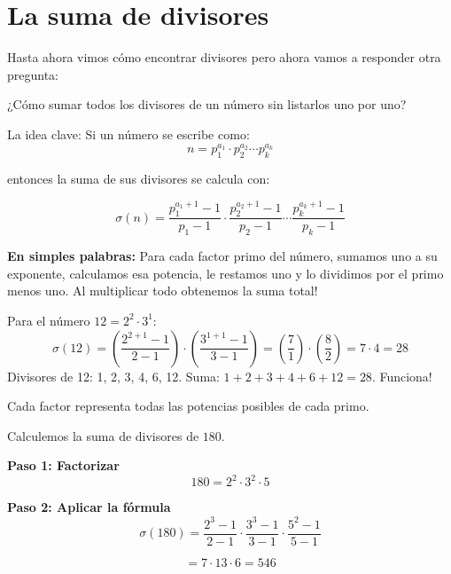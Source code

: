 \documentclass[12pt]{article}
\begin{document}
    \newpage
    \section{La suma de divisores}
    Hasta ahora vimos cómo encontrar divisores pero ahora vamos a responder otra pregunta:

    \begin{idea}
        ¿Cómo sumar todos los divisores de un número sin listarlos uno por uno?
    \end{idea}

    La idea clave:
    Si un número se escribe como:
    \[
    n = p_1^{a_1} \cdot p_2^{a_2} \cdots p_k^{a_k}
    \]

   entonces la suma de sus divisores se calcula con:

\[
\sigma(n) = \frac{p_1^{a_1+1} - 1}{p_1 - 1} \cdot \frac{p_2^{a_2+1} - 1}{p_2 - 1} \cdots \frac{p_k^{a_k+1} - 1}{p_k - 1}
\]

\begin{idea}
    \textbf{En simples palabras:} Para cada factor primo del número, sumamos uno a su exponente, calculamos esa potencia, le restamos uno y lo dividimos por el primo menos uno. Al multiplicar todo obtenemos la suma total!
\end{idea}

\begin{ejemplo}
    Para el número $12 = 2^2 \cdot 3^1$:
    \[
    \sigma(12) = \left( \frac{2^{2+1} - 1}{2 - 1} \right) \cdot \left( \frac{3^{1+1} - 1}{3 - 1} \right) = \left( \frac{7}{1} \right) \cdot \left( \frac{8}{2} \right) = 7 \cdot 4 = 28
    \]
    Divisores de 12: 1, 2, 3, 4, 6, 12. Suma: $1+2+3+4+6+12 = 28$. Funciona!
\end{ejemplo}

    \begin{idea}
        Cada factor representa todas las potencias posibles de cada primo.
    \end{idea}

    \begin{ejemplo}
        Calculemos la suma de divisores de $180$.

        \textbf{Paso 1: Factorizar}
        \[
        180 = 2^2 \cdot 3^2 \cdot 5
        \]

        \textbf{Paso 2: Aplicar la fórmula}
        \[
        \sigma(180) =
        \frac{2^{3}-1}{2-1}
        \cdot
        \frac{3^{3}-1}{3-1}
        \cdot
        \frac{5^{2}-1}{5-1}
        \]

        \[
        = 7 \cdot 13 \cdot 6 = 546
        \]
    \end{ejemplo}
\end{document}
